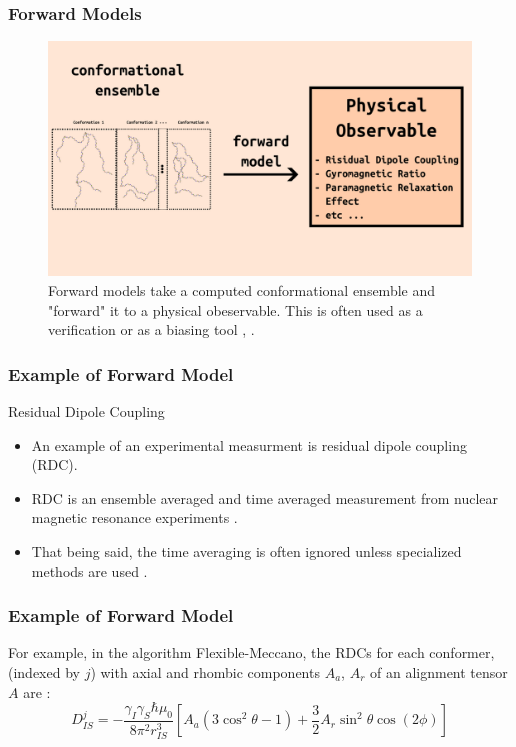 \documentclass{beamer}
\begin{document}
\begin{frame}
\frametitle{Forward Models}
\begin{figure}
    \centering
    \includegraphics[scale=0.35]{forward-model.png}
    \caption{Forward models take a computed conformational ensemble and "forward" it to a physical obeservable.
    This is often used as a verification or as a biasing tool \cite{thomasenConformationalEnsemblesIntrinsically2022}, \cite{ozenneFlexiblemeccanoToolGeneration2012}. }
    \label{fig:forward-model}
\end{figure}
\end{frame}

\begin{frame}
\frametitle{Example of Forward Model}
\begin{block}{Residual Dipole Coupling}
    \begin{itemize}
        \item An example of an experimental measurment is residual dipole coupling (RDC).
        \item RDC is an ensemble averaged and time averaged measurement from nuclear magnetic resonance experiments \cite{marionIntroductionBiologicalNMR2013}.
        \item That being said, the time averaging is often ignored unless specialized methods are used \cite{thomasenConformationalEnsemblesIntrinsically2022}.
    \end{itemize}
\end{block}
\end{frame}

\begin{frame}
\frametitle{Example of Forward Model}
    For example, in the algorithm Flexible-Meccano, the RDCs for each conformer, (indexed by $j$) with axial and rhombic components $A_a$, $A_r$ of an alignment tensor $A$ are \cite{ozenneFlexiblemeccanoToolGeneration2012}:
    \begin{equation}\label{eq:rdc}
        D^j_{IS} = - \frac{\gamma_I \gamma_S \hbar \mu_0}{8 \pi^2 r^3_{IS}} \left [ A_a (3 \cos^2 \theta - 1) + \frac{3}{2} A_r \sin^2 \theta \cos (2 \phi) \right ]
    \end{equation}
\end{frame}
\end{document}
